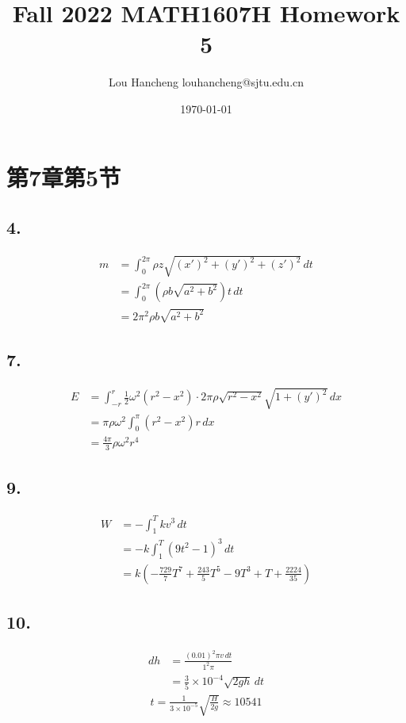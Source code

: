 \documentclass[12pt, a4paper, oneside]{ctexart}
\title{Fall 2022 MATH1607H Homework 5}
\author{Lou Hancheng \quad louhancheng@sjtu.edu.cn}
\date{\today}
\begin{document}
    \maketitle
    \section*{第7章第5节}
        \subsection*{4.}
            $$
                \begin{aligned}
                    m&=\int_{0}^{2\pi} \rho z\sqrt{(x')^2+(y')^2+(z')^2} \,dt\\
                    &=\int_{0}^{2\pi} (\rho b\sqrt{a^2+b^2})t \,dt\\
                    &=2\pi^2\rho b\sqrt{a^2+b^2}
                \end{aligned}
            $$
        \subsection*{7.}
            $$
                \begin{aligned}
                    E&=\int_{-r}^{r} \frac12\omega^2(r^2-x^2)\cdot2\pi\rho\sqrt{r^2-x^2}\sqrt{1+(y')^2}\,dx\\
                    &=\pi\rho\omega^2\int_{0}^{\pi}(r^2-x^2)r \,dx\\
                    &=\frac{4\pi}{3}\rho\omega^2r^4
                \end{aligned}
            $$
        \subsection*{9.}
            $$
                \begin{aligned}
                    W&=-\int_{1}^{T}kv^3\,dt\\
                    &=-k\int_{1}^{T}(9t^2-1)^3\,dt\\
                    &=k(-\frac{729}{7}T^7+\frac{243}{5}T^5-9T^3+T+\frac{2224}{35})
                \end{aligned}
            $$
        \subsection*{10.}
            $$
                \begin{aligned}
                    dh&=\frac{(0.01)^2\pi v \,dt}{1^2\pi}\\
                    &=\frac{3}{5}\times 10^{-4}\sqrt{2gh}\,dt
                \end{aligned}
            $$
            $$
                \begin{aligned}
                    t=\frac{1}{3\times 10^{-5}}\sqrt{\frac{H}{2g}}\approx 10541
                \end{aligned}
            $$
\end{document}
